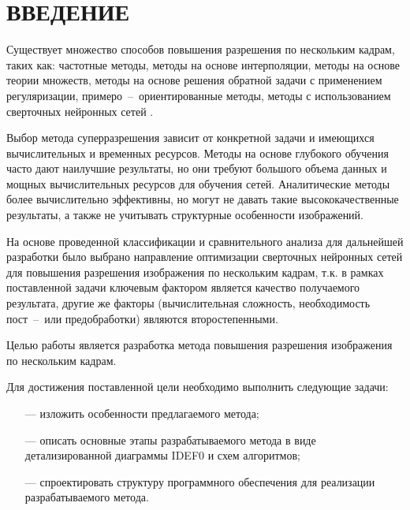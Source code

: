 \chapter*{ВВЕДЕНИЕ}

Существует множество способов повышения разрешения по нескольким кадрам, таких как: частотные методы, методы на основе интерполяции, методы на основе теории множеств, методы на основе решения обратной задачи с применением регуляризации, примеро~--~ориентированные методы, методы с использованием сверточных нейронных сетей \cite{frequency, example, patch, cnn, map, mnk, pocs, pav, senov}.

Выбор метода суперразрешения зависит от конкретной задачи и имеющихся вычислительных и временных ресурсов. Методы на основе глубокого обучения часто дают наилучшие результаты, но они требуют большого объема данных и мощных вычислительных ресурсов для обучения сетей. Аналитические методы более вычислительно эффективны, но могут не давать такие высококачественные результаты, а также не учитывать структурные особенности изображений.

На основе проведенной классификации и сравнительного анализа для дальнейшей разработки было выбрано направление оптимизации сверточных нейронных сетей для повышения разрешения изображения по нескольким кадрам, т.к. в рамках поставленной задачи ключевым фактором является качество получаемого результата, другие же факторы (вычислительная сложность, необходимость пост~--~или предобработки) являются второстепенными.

Целью работы является разработка метода повышения разрешения изображения по нескольким кадрам.

Для достижения поставленной цели необходимо выполнить следующие задачи:

\begin{itemize}
    \item[---] изложить особенности предлагаемого метода;
    \item[---] описать основные этапы разрабатываемого метода в виде детализированной диаграммы IDEF0 и схем алгоритмов;
    \item[---] спроектировать структуру программного обеспечения для реализации разрабатываемого метода.
\end{itemize}